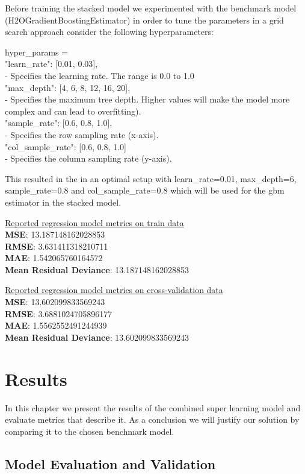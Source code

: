 \documentclass{article}
\begin{document}
Before training the stacked model we experimented with the benchmark model (H2OGradientBoostingEstimator) in order to tune the parameters in a grid search approach consider the following hyperparameters:

hyper\_params = {\\
"learn\_rate": [0.01, 0.03], \\
- Specifies the learning rate. The range is 0.0 to 1.0\\
"max\_depth": [4, 6, 8, 12, 16, 20], \\
- Specifies the maximum tree depth. Higher values will make the model more complex and can lead to overfitting).\\
"sample\_rate": [0.6, 0.8, 1.0], \\
- Specifies the row sampling rate (x-axis).\\
"col\_sample\_rate": [0.6, 0.8, 1.0]\\
- Specifies the column sampling rate (y-axis).}

This resulted in the in an optimal setup with learn\_rate=0.01, max\_depth=6,  sample\_rate=0.8 and col\_sample\_rate=0.8 which will be used for the gbm estimator in the stacked model. 

\underline{Reported regression model metrics on train data}\\
\textbf{MSE}: 13.187148162028853\\
\textbf{RMSE}: 3.631411318210711\\
\textbf{MAE}: 1.542065760164572\\
\textbf{Mean Residual Deviance}: 13.187148162028853

\underline{Reported regression model metrics on cross-validation data}\\
\textbf{MSE}: 13.602099833569243\\
\textbf{RMSE}: 3.6881024705896177\\
\textbf{MAE}: 1.5562552491244939\\
\textbf{Mean Residual Deviance}: 13.602099833569243

\newpage
\section{Results}
In this chapter we present the results of the combined super learning model and evaluate metrics that describe it. As a conclusion we will justify our solution by comparing it to the chosen benchmark model.

\subsection{Model Evaluation and Validation}
\end{document}
